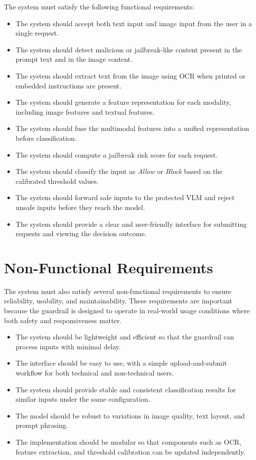The system must satisfy the following functional requirements:

\begin{itemize}
    \item The system should accept both text input and image input from the user in a single request.
    \item The system should detect malicious or jailbreak-like content present in the prompt text and in the image content.
    \item The system should extract text from the image using OCR when printed or embedded instructions are present.
    \item The system should generate a feature representation for each modality, including image features and textual features.
    \item The system should fuse the multimodal features into a unified representation before classification.
    \item The system should compute a jailbreak risk score for each request.
    \item The system should classify the input as \textit{Allow} or \textit{Block} based on the calibrated threshold values.
    \item The system should forward safe inputs to the protected VLM and reject unsafe inputs before they reach the model.
    \item The system should provide a clear and user-friendly interface for submitting requests and viewing the decision outcome.
   
\end{itemize}

\section{Non-Functional Requirements}

The system must also satisfy several non-functional requirements to ensure reliability, usability, and maintainability. These requirements are important because the guardrail is designed to operate in real-world usage conditions where both safety and responsiveness matter.

\begin{itemize}
    \item The system should be lightweight and efficient so that the guardrail can process inputs with minimal delay.
    \item The interface should be easy to use, with a simple upload-and-submit workflow for both technical and non-technical users.
    \item The system should provide stable and consistent classification results for similar inputs under the same configuration.
    \item The model should be robust to variations in image quality, text layout, and prompt phrasing.
    \item The implementation should be modular so that components such as OCR, feature extraction, and threshold calibration can be updated independently.
    

\end{itemize}

